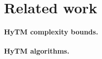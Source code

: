 \section{Related work}
\label{sec:rel}
%
\paragraph{HyTM complexity bounds.}

\paragraph{HyTM algorithms.}

